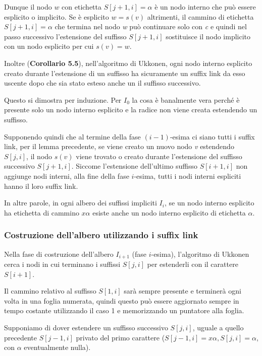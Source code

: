 Dunque il nodo $ w $ con etichetta $ S[j+1, i]  = \alpha$ è un nodo interno che può essere esplicito o implicito. Se è esplicito $w = s(v)$ altrimenti, il cammino di etichetta $ S[j+1, i] = \alpha $ che termina nel nodo \textit{w} può continuare solo con \textit{c} e quindi nel passo successivo l'estensione del suffisso $ S[j+1,i] $ sostituisce il nodo implicito con un nodo esplicito per cui $s(v) = w$.




Inoltre (\textbf{Corollario 5.5}), nell'algoritmo di Ukkonen, ogni nodo interno esplicito creato durante l'estensione di un suffisso ha sicuramente un suffix link da esso uscente dopo che sia stato esteso anche un il suffisso successivo.

Questo si dimostra per induzione. Per $ I_0 $ la cosa è banalmente vera perché è presente solo un nodo interno esplicito e la radice non viene creata estendendo un suffisso.

Supponendo quindi che al termine della fase $(i-1)$-esima ci siano tutti i suffix link, per il lemma precedente, se viene creato un nuovo nodo \textit{v} estendendo $ S[j,i] $, il nodo $ s(v) $ viene trovato o creato durante l'estensione del suffisso successivo $ S[j+1,i] $. Siccome l'estensione dell'ultimo suffisso $ S[i+1,i] $ non aggiunge nodi interni, alla fine della fase $ i $-esima, tutti i nodi interni espliciti hanno il loro suffix link.

In altre parole, in ogni albero dei suffissi impliciti $ I_i $, se un nodo interno esplicito ha etichetta di cammino $ x\alpha $ esiste anche un nodo interno esplicito di etichetta $\alpha$.

\subsubsection{Costruzione dell'albero utilizzando i suffix link}

Nella fase di costruzione dell'albero $ I_{i+1} $ (fase $ i $-esima), l'algoritmo di Ukkonen cerca i nodi in cui terminano i suffissi $ S[j,i] $ per estenderli con il carattere $ S[i+1] $.

Il cammino relativo al suffisso $ S[1,i] $ sarà sempre presente e terminerà ogni volta in una foglia numerata, quindi questo può essere aggiornato sempre in tempo costante utilizzando il caso 1 e memorizzando un puntatore alla foglia.

Supponiamo di dover estendere un suffisso successivo $ S[j,i] $, uguale a quello precedente $ S[j-1,i] $ privato del primo carattere ($S[j-1,i] = x\alpha, S[j,i]= \alpha$, con $\alpha$ eventualmente nulla).

